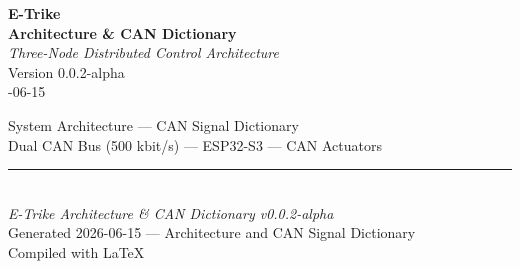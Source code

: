 \documentclass[12pt,a4paper,oneside]{report}
\begin{document}

\thispagestyle{empty}

\vspace*{60mm}

\begin{center}
  {\fontsize{28}{34}\selectfont\textbf{E-Trike}}\\[8mm]
  {\fontsize{22}{28}\selectfont\textbf{Architecture \& CAN Dictionary}}\\[20mm]
  {\fontsize{14}{18}\selectfont\textit{Three-Node Distributed Control Architecture}}\\[30mm]
  {\fontsize{12}{15}\selectfont Version 0.0.2-alpha}\\[4mm]
  {\fontsize{11}{14}-06-15}
\end{center}

\vfill

\begin{center}
  {\footnotesize
  System Architecture --- CAN Signal Dictionary\\[2mm]
  Dual CAN Bus (500 kbit/s) --- ESP32-S3 --- CAN Actuators
  }
\end{center}

\newpage


\setcounter{tocdepth}{1}
\tableofcontents
\newpage




\vfill

\begin{center}
  \rule{0.5\textwidth}{0.4pt}\\[4mm]
  {\small\textit{E-Trike Architecture \& CAN Dictionary v0.0.2-alpha}}\\[2mm]
  {\small Generated 2026-06-15 --- Architecture and CAN Signal Dictionary}\\[2mm]
  {\small Compiled with \LaTeX}
\end{center}
\end{document}
